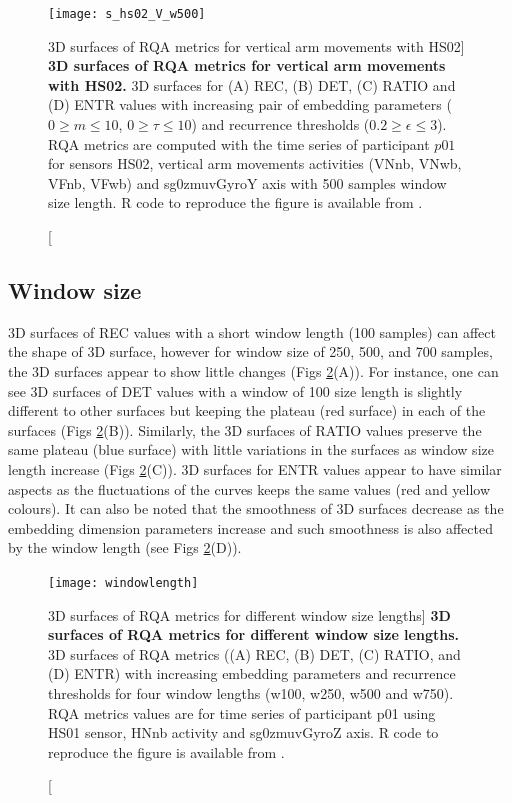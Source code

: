 \begin{figure}
\centering
\texttt{[image: s\_hs02\_V\_w500]}
    \caption
	[3D surfaces of RQA metrics for vertical arm movements with HS02]{
	{\bf 3D surfaces of RQA metrics for vertical arm movements with HS02.}
	3D surfaces for (A) REC, (B) DET, (C) RATIO and (D) ENTR values 
	with increasing pair of embedding parameters 
	($0 \ge m \le 10$, $0 \ge \tau \le 10$) 
	and recurrence thresholds ($ 0.2 \ge \epsilon \le 3 $).
	RQA metrics are computed with the time series of participant $p01$ 
	for sensors HS02, vertical arm movements activities 
	(VNnb, VNwb, VFnb, VFwb) and 
	sg0zmuvGyroY axis with 500 samples window size length. 
        R code to reproduce the figure is available from \cite{hwum2018}.
	}
\label{fig:topo_s_hs02_V_w500}
\end{figure}


\newpage
\subsection{Window size}
3D surfaces of REC values with a short window length (100 samples) can affect
the shape of 3D surface, however for window size of 250, 500, and 700 samples,
the 3D surfaces appear to show little changes 
(Figs \ref{fig:topo_windows_hii}(A)).
For instance, one can see 3D surfaces of DET values with a window of 100 
size length is slightly different to other surfaces but keeping the plateau
(red surface) in each of the surfaces (Figs \ref{fig:topo_windows_hii}(B)).
Similarly, the 3D surfaces of RATIO values preserve the same plateau 
(blue surface) with little variations in the surfaces as window size length 
increase (Figs \ref{fig:topo_windows_hii}(C)).
3D surfaces for ENTR values appear to have similar aspects as the 
fluctuations of the curves keeps the same values (red and yellow colours).
It can also be noted that the smoothness of 3D surfaces decrease as the 
embedding dimension parameters increase and such smoothness is also affected 
by the window length (see Figs \ref{fig:topo_windows_hii}(D)).


\begin{figure}
\centering
\texttt{[image: windowlength]}
    \caption
	[3D surfaces of RQA metrics for different window size lengths]{
	{\bf 3D surfaces of RQA metrics for different window size lengths.}
	3D surfaces of RQA metrics ((A) REC, (B) DET, (C) RATIO, and (D) ENTR) 
	with increasing embedding 
	parameters and recurrence thresholds for four window 
	lengths (w100, w250, w500 and  w750).
	RQA metrics values are for time series of participant p01 
	using HS01 sensor, HNnb activity and sg0zmuvGyroZ axis.
	R code to reproduce the figure is available from \cite{hwum2018}.
       }
\label{fig:topo_windows_hii}
\end{figure}


